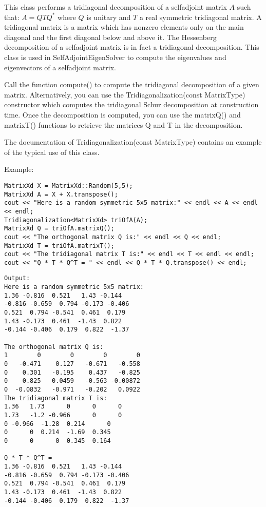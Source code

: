 This class performs a tridiagonal decomposition of a selfadjoint matrix $A$ such that: $A = QTQ^{*}$ where $Q$  is unitary and $T$ a real symmetric tridiagonal matrix.
A tridiagonal matrix is a matrix which has nonzero elements only on the main diagonal and the first diagonal below and above it. The Hessenberg decomposition of a selfadjoint matrix is in fact a tridiagonal decomposition. This class is used in SelfAdjointEigenSolver to compute the eigenvalues and eigenvectors of a selfadjoint matrix.

Call the function compute() to compute the tridiagonal decomposition of a given matrix. Alternatively, you can use the Tridiagonalization(const MatrixType) constructor which computes the tridiagonal Schur decomposition at construction time. Once the decomposition is computed, you can use the matrixQ() and matrixT() functions to retrieve the matrices Q and T in the decomposition.

The documentation of Tridiagonalization(const MatrixType) contains an example of the typical use of this class.



Example:
\begin{lstlisting}
MatrixXd X = MatrixXd::Random(5,5);
MatrixXd A = X + X.transpose();
cout << "Here is a random symmetric 5x5 matrix:" << endl << A << endl << endl;
Tridiagonalization<MatrixXd> triOfA(A);
MatrixXd Q = triOfA.matrixQ();
cout << "The orthogonal matrix Q is:" << endl << Q << endl;
MatrixXd T = triOfA.matrixT();
cout << "The tridiagonal matrix T is:" << endl << T << endl << endl;
cout << "Q * T * Q^T = " << endl << Q * T * Q.transpose() << endl;
\end{lstlisting}

\begin{verbatim}
Output:
Here is a random symmetric 5x5 matrix:
1.36 -0.816  0.521   1.43 -0.144
-0.816 -0.659  0.794 -0.173 -0.406
0.521  0.794 -0.541  0.461  0.179
1.43 -0.173  0.461  -1.43  0.822
-0.144 -0.406  0.179  0.822  -1.37

The orthogonal matrix Q is:
1        0        0        0        0
0   -0.471    0.127   -0.671   -0.558
0    0.301   -0.195    0.437   -0.825
0    0.825   0.0459   -0.563 -0.00872
0  -0.0832   -0.971   -0.202   0.0922
The tridiagonal matrix T is:
1.36   1.73      0      0      0
1.73   -1.2 -0.966      0      0
0 -0.966  -1.28  0.214      0
0      0  0.214  -1.69  0.345
0      0      0  0.345  0.164

Q * T * Q^T = 
1.36 -0.816  0.521   1.43 -0.144
-0.816 -0.659  0.794 -0.173 -0.406
0.521  0.794 -0.541  0.461  0.179
1.43 -0.173  0.461  -1.43  0.822
-0.144 -0.406  0.179  0.822  -1.37
\end{verbatim}





